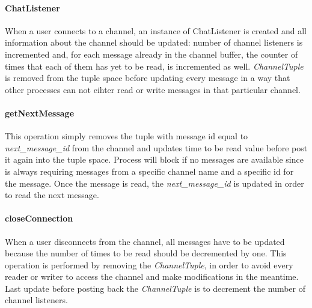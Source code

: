 \documentclass[10pt,a4paper]{article}
\begin{document}
\paragraph{ChatListener} When a user connects to a channel, an instance of ChatListener is created and all information about the channel should be updated: number of channel listeners is incremented and, for each message already in the channel buffer, the counter of times that each of them has yet to be read, is incremented as well.
\textit{ChannelTuple} is removed from the tuple space before updating every message in a way that other processes can not eihter read or write messages in that particular channel.

\paragraph{getNextMessage} This operation simply removes the tuple with message id equal to \textit{next\_message\_id} from the channel and updates time to be read value before post it again into the tuple space. Process will block if no messages are available since is always requiring messages from a specific channel name and a specific id for the message.
Once the message is read, the \textit{next\_message\_id} is updated in order to read the next message.

\paragraph{closeConnection} When a user disconnects from the channel, all messages have to be updated because the number of times to be read should be decremented by one. This operation is performed by removing the \textit{ChannelTuple}, in order to avoid every reader or writer to access the channel and make modifications in the meantime. Last update before posting back the \textit{ChannelTuple} is to decrement the number of channel listeners.
\end{document}
